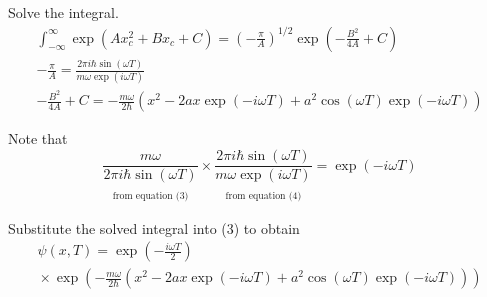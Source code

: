 \documentclass[12pt]{article}
\begin{document}
Solve the integral.
\begin{gather*}
\int_{-\infty}^\infty\exp(Ax_c^2+Bx_c+C)
=\left(-\frac{\pi}{A}\right)^{1/2}
\exp\left(-\frac{B^2}{4A}+C\right)
\\
-\frac{\pi}{A}
=\frac{2\pi i\hbar\sin(\omega T)}{m\omega\exp(i\omega T)}
\tag{4}
\\
-\frac{B^2}{4A}+C
=-\frac{m\omega}{2\hbar}
\left(x^2-2ax\exp(-i\omega T)+a^2\cos(\omega T)\exp(-i\omega T)\right)
\tag{5}
\end{gather*}

Note that
\begin{equation*}
\underset{\substack{\\[1ex]\text{from equation (3)}}}
{\frac{m\omega}{2\pi i\hbar\sin(\omega T)}}
\times
\underset{\substack{\\[1ex]\text{from equation (4)}}}
{\frac{2\pi i\hbar\sin(\omega T)}{m\omega\exp(i\omega T)}}
=\exp(-i\omega T)
\tag{6}
\end{equation*}

Substitute the solved integral into (3) to obtain
\begin{multline*}
\psi(x,T)=\exp\left(-\frac{i\omega T}{2}\right)
\\
{}\times
\exp\left(
-\frac{m\omega}{2\hbar}
\left(x^2-2ax\exp(-i\omega T)+a^2\cos(\omega T)\exp(-i\omega T)\right)
\right)
\end{multline*}
\end{document}
